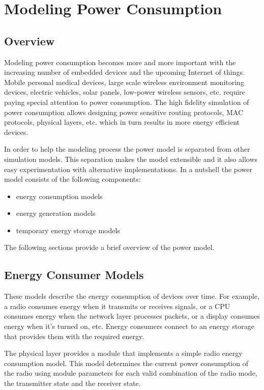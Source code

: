 \chapter{Modeling Power Consumption}
\label{cha:power}

\section{Overview}

Modeling power consumption becomes more and more important with the increasing
number of embedded devices and the upcoming Internet of things. Mobile personal
medical devices, large scale wireless environment monitoring devices, electric
vehicles, solar panels, low-power wireless sensors, etc. require paying special
attention to power consumption. The high fidelity simulation of power
consumption allows designing power sensitive routing protocols, MAC protocols,
physical layers, etc. which in turn results in more energy efficient devices.

In order to help the modeling process the power model is separated from other
simulation models. This separation makes the model extensible and it also allows
easy experimentation with alternative implementations. In a nutshell the power
model consists of the following components:

\begin{itemize}
  \item energy consumption models
  \item energy generation models
  \item temporary energy storage models
\end{itemize}

The following sections provide a brief overview of the power model.

\section{Energy Consumer Models}

These models describe the energy consumption of devices over time. For example,
a radio consumes energy when it transmits or receives signals, or a CPU consumes
energy when the network layer processes packets, or a display consumes energy
when it's turned on, etc. Energy consumers connect to an energy storage that
provides them with the required energy.

The physical layer provides a  module that 
implements a simple radio energy consumption model. This model determines the
current power consumption of the radio using module parameters for each valid
combination of the radio mode, the transmitter state and the receiver state.

